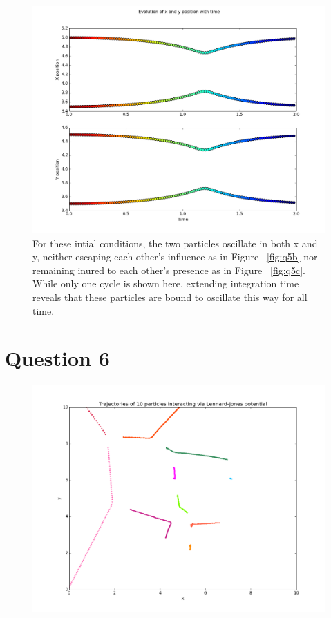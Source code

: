 \documentclass[a4paper,12pt]{article}
\begin{document}
\begin{figure}[H]
\centering
\includegraphics[width = \linewidth]{lab6q5di.png}
\caption{For these intial conditions, the two particles oscillate in both x and y, neither escaping each other's influence as in Figure ~\ref{fig:q5b} nor remaining inured to each other's presence as in Figure ~\ref{fig:q5c}. While only one cycle is shown here, extending integration time reveals that these particles are bound to oscillate this way for all time.}
\label{fig:q5di}
\end{figure}

\section{Question 6}

\begin{figure}[H]
\centering
\includegraphics[width = \linewidth]{lab6q6_1.png}
\caption{}
\label{fig:q6}
\end{figure}
\end{document}
